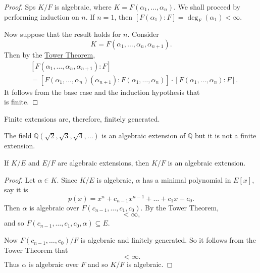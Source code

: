 \documentclass[notoc,notitlepage]{tufte-book}
\begin{document}
\begin{proof}
  Sps $K / F$ is algebraic, where $K = F(\alpha_1, \ldots, \alpha_n)$. We shall proceed by performing
  induction on $n$. If $n = 1$, then $[F(\alpha_1) : F] = \deg_F(\alpha_1) < \infty$.

  Now suppose that the result holds for $n$. Consider 
  \begin{equation*}
    K = F(\alpha_1, \ldots, \alpha_n, \alpha_{n + 1}).
  \end{equation*}
  Then by the \hyperref[thm:tower_theorem]{Tower Theorem},
  \begin{align*}
    &[F(\alpha_1, \ldots, \alpha_n, \alpha_{n + 1}) : F] \\
    &= [F(\alpha_1, \ldots, \alpha_{n})(\alpha_{n + 1}) : F(\alpha_1, \ldots,
    \alpha_n)] \cdot [F(\alpha_1, \ldots, \alpha_n) : F].
  \end{align*}
  It follows from the base case and the induction hypothesis that
  \begin{equation*}
    [F(\alpha_1, \ldots, \alpha_{n +1}):F]
  \end{equation*}
  is finite.
\end{proof}

\begin{note}
  Finite extensions are, therefore, finitely generated.
\end{note}

\begin{eg}
  The field $\mathbb{Q}(\sqrt{2}, \sqrt{3}, \sqrt{4}, \ldots)$ is an algebraic extension of $\mathbb{Q}$
  but it is not a finite extension.
\end{eg}

\begin{propo}\label{propo:greater_algebraic_extensions}
  If $K / E$ and $E / F$ are algebraic extensions, then $K / F$ is an algebraic extension.
\end{propo}

\begin{proof}
  Let $\alpha \in K$. Since $K / E$ is algebraic, $\alpha$ has a minimal polynomial in $E[x]$, say it is
  \begin{equation*}
    p(x) = x^n + c_{n - 1} x^{n - 1} + \hdots + c_1 x + c_0.
  \end{equation*}
  Then $\alpha$ is algebraic over $F(c_{n - 1}, \ldots, c_1, c_0)$. By the Tower Theorem,
  \begin{equation*}
    [F(c_{n - 1}, \ldots, c_1, c_0, \alpha) : F(c_{n - 1}, \ldots, c_0)] < \infty,
  \end{equation*}
  and so $F(c_{n - 1}, \ldots, c_1, c_0, \alpha) \subseteq E$.
  
  Now $F(c_{n - 1}, \ldots, c_0) / F$ is algebraic and finitely generated. So it follows from the Tower
  Theorem that
  \begin{equation*}
    [F(c_{n - 1}, \ldots, c_0, \alpha) : F] < \infty.
  \end{equation*}
  Thus $\alpha$ is algebraic over $F$ and so $K / F$ is algebraic.
\end{proof}
\end{document}
